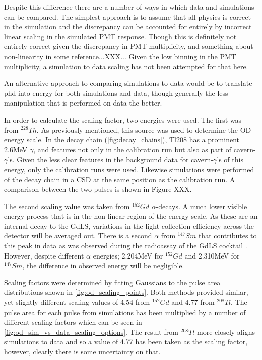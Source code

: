 \par
Despite this difference there are a number of ways in which data and simulations can be compared.
The simplest approach is to assume that all physics is correct in the simulation and the discrepancy can be accounted for entirely by incorrect linear scaling in the simulated PMT response.
Though this is definitely not entirely correct given the discrepancy in PMT multiplicity, and something about non-linearity in some reference...XXX...
Given the low binning in the PMT multiplicity, a simulation to data scaling has not been attempted for that here.
\par
An alternative approach to comparing simulations to data would be to translate phd into energy for both simulations and data, though generally the less manipulation that is performed on data the better.

\par
In order to calculate the scaling factor, two energies were used.
The first was from ${}^{228}Th$.
As previously mentioned, this source was used to determine the OD energy scale.
In the decay chain (\autoref{fig:decay_chains}), Tl208 has a prominent 2.6MeV $\gamma$, and features not only in the calibration run but also as part of cavern-$\gamma$'s.
Given the less clear features in the background data for cavern-$\gamma$'s of this energy, only the calibration runs were used.
Likewise simulations were performed of the decay chain in a CSD at the same position as the calibration run.
A comparison between the two pulses is shown in Figure XXX.
\par
The second scaling value was taken from ${}^{152}Gd$ $\alpha$-decays.
A much lower visible energy process that is in the non-linear region of the energy scale.
As these are an internal decay to the GdLS, variations in the light collection efficiency across the detector will be averaged out.
There is a second $\alpha$ from ${}^{147}Sm$ that contributes to this peak in data as was observed during the radioassay of the GdLS cocktail \cite{scotthaselschwardt_thesis_ref}.
However, despite different $\alpha$ energies; 2.204MeV for ${}^{152}Gd$ and 2.310MeV for ${}^{147}Sm$, the difference in observed energy will be negligible.

\par
Scaling factors were determined by fitting Gaussians to the pulse area distributions shown in \autoref{fig:od_scaling_points}.
Both methods provided similar, yet slightly different scaling values of 4.54 from ${}^{152}Gd$ and 4.77 from ${}^{208}Tl$.
The pulse area for each pulse from simulations has been multiplied by a number of different scaling factors which can be seen in \autoref{fig:od_sim_vs_data_scaling_options}.
The result from ${}^{208}Tl$ more closely aligns simulations to data and so a value of 4.77 has been taken as the scaling factor, however, clearly there is some uncertainty on that.






